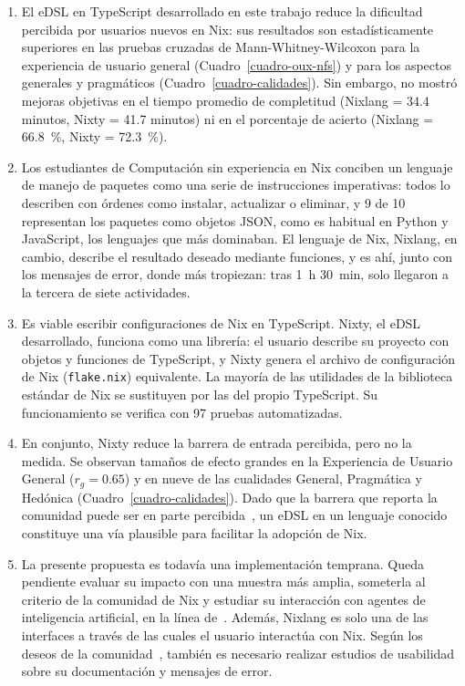 \begin{enumerate}
\item El eDSL en TypeScript desarrollado en este trabajo reduce la dificultad percibida por usuarios nuevos en Nix: sus resultados son estadísticamente superiores en las pruebas cruzadas de Mann-Whitney-Wilcoxon para la experiencia de usuario general (Cuadro~\ref{cuadro-oux-nfs}) y para los aspectos generales y pragmáticos (Cuadro~\ref{cuadro-calidades}). Sin embargo, no mostró mejoras objetivas en el tiempo promedio de completitud (Nixlang = 34.4 minutos, Nixty = 41.7 minutos) ni en el porcentaje de acierto (Nixlang = 66.8~\%, Nixty = 72.3~\%).
\item Los estudiantes de Computación sin experiencia en Nix conciben un lenguaje de manejo de paquetes como una serie de instrucciones imperativas: todos lo describen con órdenes como instalar, actualizar o eliminar, y 9 de 10 representan los paquetes como objetos JSON, como es habitual en Python y JavaScript, los lenguajes que más dominaban. El lenguaje de Nix, Nixlang, en cambio, describe el resultado deseado mediante funciones, y es ahí, junto con los mensajes de error, donde más tropiezan: tras 1~h 30~min, solo llegaron a la tercera de siete actividades.
\item Es viable escribir configuraciones de Nix en TypeScript. Nixty, el eDSL desarrollado, funciona como una librería: el usuario describe su proyecto con objetos y funciones de TypeScript, y Nixty genera el archivo de configuración de Nix (\texttt{flake.nix}) equivalente. La mayoría de las utilidades de la biblioteca estándar de Nix se sustituyen por las del propio TypeScript. Su funcionamiento se verifica con 97 pruebas automatizadas.
\item En conjunto, Nixty reduce la barrera de entrada percibida, pero no la medida. Se observan tamaños de efecto grandes en la Experiencia de Usuario General ($r_g = 0.65$) y en nueve de las cualidades General, Pragmática y Hedónica (Cuadro~\ref{cuadro-calidades}). Dado que la barrera que reporta la comunidad puede ser en parte percibida~\cite{NixCommunitySurvey2024}, un eDSL en un lenguaje conocido constituye una vía plausible para facilitar la adopción de Nix.
\item La presente propuesta es todavía una implementación temprana. Queda pendiente evaluar su impacto con una muestra más amplia, someterla al criterio de la comunidad de Nix y estudiar su interacción con agentes de inteligencia artificial, en la línea de~\cite{Schwaighofer2026}. Además, Nixlang es solo una de las interfaces a través de las cuales el usuario interactúa con Nix. Según los deseos de la comunidad~\cite{2025CommunitySurvey}, también es necesario realizar estudios de usabilidad sobre su documentación y mensajes de error.
\end{enumerate}
